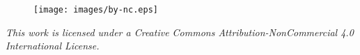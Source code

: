 \thispagestyle{empty}
\mbox{}
\vfill    
\begin{figure}[H]
    \texttt{[image: images/by-nc.eps]}
\end{figure}
\textit{This work is licensed under a Creative Commons Attribution-NonCommercial 4.0 International License.}
